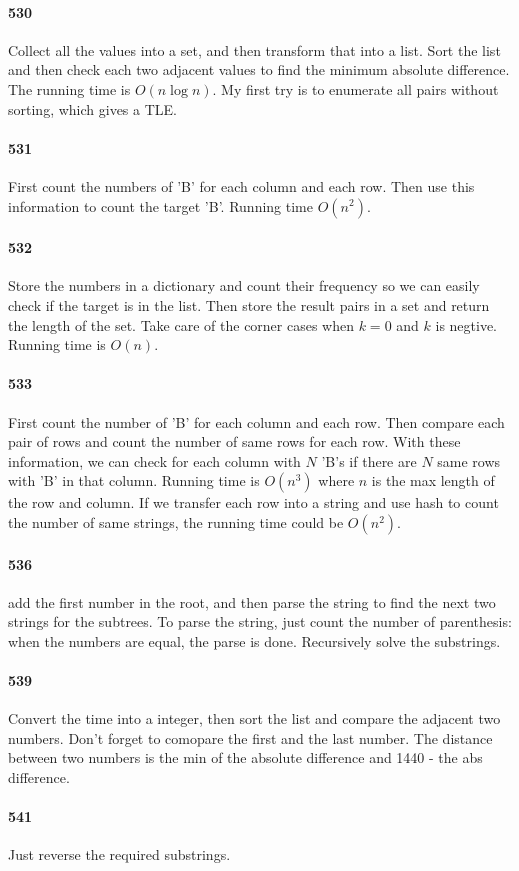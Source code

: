 \documentclass[11pt]{article}
\begin{document}
\paragraph{530}
Collect all the values into a set, and then transform that into a list.
Sort the list and then check each two adjacent values to find the minimum absolute difference. 
The running time is $O(n \log n)$.
My first try is to enumerate all pairs without sorting, which gives a TLE.

\paragraph{531}
First count the numbers of 'B' for each column and each row. Then use this information to count the target 'B'.
Running time $O(n^2)$.


\paragraph{532}
Store the numbers in a dictionary and count their frequency so we can easily check if the target is in the list. 
Then store the result pairs in a set and return the length of the set. Take care of the corner cases when $k = 0$ 
and $k$ is negtive.
Running time is $O(n)$.


\paragraph{533}
First count the number of 'B' for each column and each row. Then compare each pair of rows and count the number of same rows
for each row. With these information, we can check for each column with $N$ 'B's if there are $N$ same rows with 'B' in that 
column. 
Running time is $O(n^3)$ where $n$ is the max length of the row and column. If we transfer each row into a string and use hash to count the number of same strings, the running time could be $O(n^2)$.

\paragraph{536}
add the first number in the root, and then parse the string to find the next two strings for the subtrees. To parse the 
string, just count the number of parenthesis: when the numbers are equal, the parse is done. Recursively solve the substrings.


\paragraph{539}
Convert the time into a integer, then sort the list and compare the adjacent two numbers. Don't forget to comopare the first
and the last number. The distance between two numbers is the min of the absolute difference and 1440 - the abs difference.

\paragraph{541}
Just reverse the required substrings.
\end{document}
